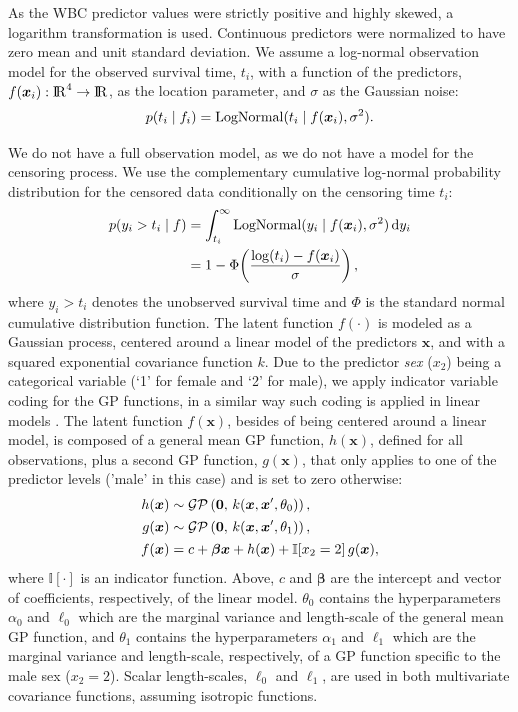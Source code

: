 As the WBC predictor values were strictly positive and highly skewed, a logarithm transformation is used. Continuous predictors were normalized to have zero mean and unit standard deviation.  
We assume a log-normal observation model for the observed survival time, $t_i$, with a function of the predictors, $f(\bm{x}_i):{\rm I\!R}^4 \to {\rm I\!R}$, as the location parameter, and $\sigma$ as the Gaussian noise: 
%
\begin{equation*}
  p(t_i \mid f_i)= \operatorname{LogNormal}(t_i \mid f(\bm{x}_i),\sigma^2).
\end{equation*}

We do not have a full observation model, as we do not have a model for the censoring process. We use the complementary cumulative log-normal probability distribution for the censored data conditionally on the censoring time $t_i$:
%
\begin{align*}
p(y_i > t_i \mid f) &= \int_{t_i}^{\infty} \operatorname{LogNormal}(y_i \mid f(\bm{x}_i),\sigma^2) \,\mathrm{d}y_i \\
&=  1 - \Phi\! \left( \frac{\log(t_i)-f(\bm{x}_i)}{\sigma} \right),
\end{align*}
%
where $y_i>t_i$ denotes the unobserved survival time {\color{blue} and $\Phi$ is the standard normal cumulative distribution function}.
The latent function $f(\cdot)$ is modeled as a Gaussian process, centered around a linear model of the predictors $\bm{x}$, and with a squared exponential covariance function $k$. Due to the predictor \textit{sex} ($x_2$) being a categorical variable (`1' for female and `2' for male), we apply indicator variable coding for the GP functions, in a similar way such coding is applied in linear models \citep{Gelman+Hill+Vehtari:2020:ROS}. The latent function $f(\bm{x})$, besides of being centered around a linear model, is composed of a general mean GP function, $h(\bm{x})$, defined for all observations, plus a second GP function, $g(\bm{x})$, that only applies to one of the predictor levels ('male' in this case) and is set to zero otherwise:
%
\begin{align*}
h(\bm{x}) &\sim \GP\left(\bm{0}, \, k(\bm{x},\bm{x}', \theta_0) \right),  \\[1pt] 
%
g(\bm{x}) &\sim \GP\left(\bm{0}, \, k(\bm{x},\bm{x}', \theta_1)\right),\\[1pt] 
%
f(\bm{x}) &= c + \bm{\beta} \bm{x} + h(\bm{x}) + \mathbb{I}\!\left[x_2=2\right]g(\bm{x}),
\end{align*}
%
where $\mathbb{I}\left[\cdot\right]$ is an indicator function. Above, $c$ and $\bm{\beta}$ are the intercept and vector of coefficients, respectively, of the linear model. $\theta_0$ contains the hyperparameters $\alpha_0$ and $\ell_0$ which are the marginal variance and length-scale of the general mean GP function, and $\theta_1$ contains the hyperparameters $\alpha_1$ and $\ell_1$ which are the marginal variance and length-scale, respectively, of a GP function specific to the male sex ($x_2=2$). Scalar length-scales, $\ell_0$ and $\ell_1$, are used in both multivariate covariance functions, assuming isotropic functions.
